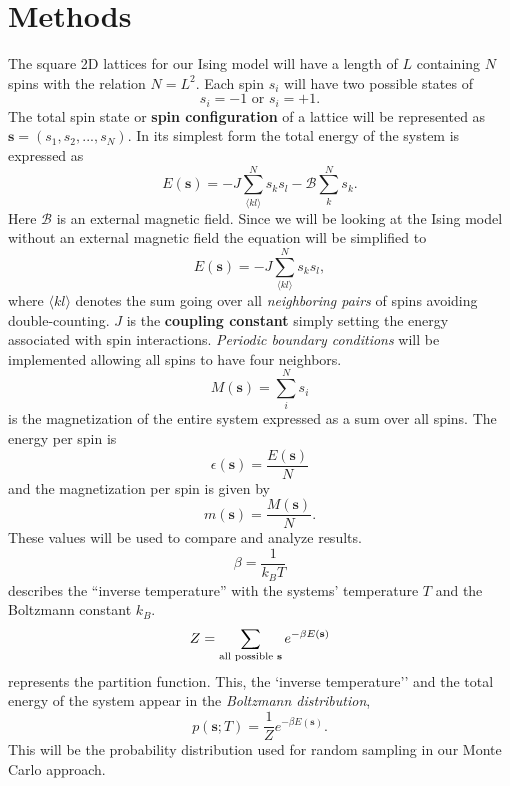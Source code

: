 \documentclass[english,notitlepage,reprint,nofootinbib]{revtex4-1}  %
\begin{document}
\section{Methods}\label{sec:methods}
The square 2D lattices for our Ising model will have a length of $L$ containing $N$ spins with the relation $N = L^2$. Each spin $s_i$ will have two possible states of
\begin{equation*}
    s_i = -1 \text{ or } s_i = +1.
\end{equation*}
The total spin state or \textbf{spin configuration} of a lattice will be represented as $\textbf{s} = (s_1, s_2, ..., s_N)$. In its simplest form the total energy of the system is expressed as
\begin{equation*}
    E(\textbf{s}) = - J \sum^N_{\langle kl \rangle} s_k s_l - \mathscr{B} \sum^N_{k} s_k.
\end{equation*}
Here $\mathscr{B}$ is an external magnetic field. Since we will be looking at the Ising model without an external magnetic field the equation will be simplified to
\begin{equation}
    E(\textbf{s}) = - J \sum^N_{\langle kl \rangle} s_k s_l,
\end{equation}
where $\langle kl \rangle$ denotes the sum going over all \textit{neighboring pairs} of spins avoiding double-counting. $J$ is the \textbf{coupling constant} simply setting the energy associated with spin interactions. \textit{Periodic boundary conditions} will be implemented allowing all spins to have four neighbors.
\begin{equation}
    M(\textbf{s}) = \sum^N_i s_i
\end{equation}
is the magnetization of the entire system expressed as a sum over all spins. The energy per spin is
\begin{equation}
    \epsilon(\textbf{s}) = \frac{E(\textbf{s})}{N} \label{eq:mean_E}
\end{equation}
and the magnetization per spin is given by
\begin{equation}
    m(\textbf{s}) = \frac{M(\textbf{s})}{N}. \label{eq:mean_M}
\end{equation}
These values will be used to compare and analyze results.
\begin{equation}
    \beta = \frac{1}{k_B T}
\end{equation}
describes the ``inverse temperature'' with the systems' temperature $T$ and the Boltzmann constant $k_B$.
\begin{equation}
    Z = \sum_{\text{all possible \textbf{s}}} e^{- \beta E(\textbf{s})}
\end{equation}
represents the partition function. This, the `inverse temperature'' and the total energy of the system appear in the \textit{Boltzmann distribution},
\begin{equation}
    p(\textbf{s};T) = \frac{1}{Z} e^{-\beta E(\textbf{s})}.\label{eq:prob_dist}
\end{equation}
This will be the probability distribution used for random sampling in our Monte Carlo approach.
\end{document}
